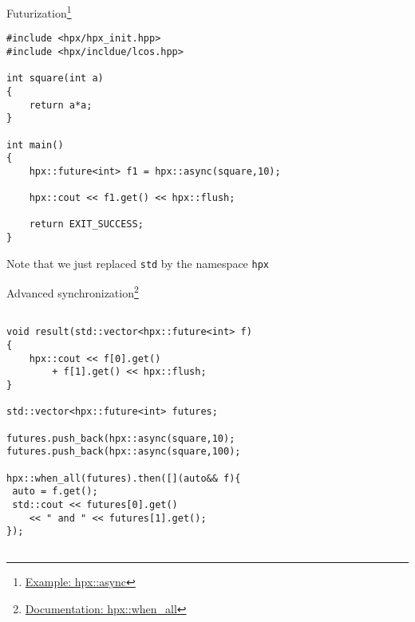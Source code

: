 \documentclass[12pt,t]{beamer}
\begin{document}
\begin{frame}[fragile]{Futurization\footnote{\tiny\href{https://stellar-group.github.io/hpx/docs/sphinx/latest/html/examples/fibonacci_local.html?highlight=async}{Example: hpx::async}}}

\begin{lstlisting}
#include <hpx/hpx_init.hpp>
#include <hpx/incldue/lcos.hpp>

int square(int a)
{ 
    return a*a; 
}

int main()
{
    hpx::future<int> f1 = hpx::async(square,10); 
    
    hpx::cout << f1.get() << hpx::flush;
    
    return EXIT_SUCCESS;
}

\end{lstlisting}
\vspace{-0.25cm}
\begin{center}
Note that we just replaced \lstinline|std| by the namespace \lstinline|hpx|
\end{center}
\end{frame}


\begin{frame}[fragile]{Advanced synchronization\footnote{\tiny\href{https://stellar-group.github.io/hpx/docs/sphinx/latest/html/api.html?highlight=when_all\#_CPPv4IDpEN3hpx8when_allE6futureI5tupleIDp6futureI1TEEEDpRR1T}{Documentation: hpx::when\_all}}}

\begin{lstlisting}

void result(std::vector<hpx::future<int> f)
{
    hpx::cout << f[0].get() 
        + f[1].get() << hpx::flush;
}

std::vector<hpx::future<int> futures;

futures.push_back(hpx::async(square,10);
futures.push_back(hpx::async(square,100);

hpx::when_all(futures).then([](auto&& f){
 auto = f.get();
 std::cout << futures[0].get() 
 	<< " and " << futures[1].get();
});


\end{lstlisting}

\end{frame}
\end{document}
